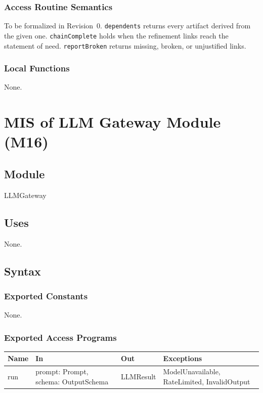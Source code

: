 \documentclass[12pt, titlepage]{article}
\begin{document}
\subsubsection{Access Routine Semantics}

To be formalized in Revision~0. \texttt{dependents} returns every artifact
derived from the given one. \texttt{chainComplete} holds when the refinement
links reach the statement of need. \texttt{reportBroken} returns missing,
broken, or unjustified links.

\subsubsection{Local Functions}

None.

\newpage
\section{MIS of LLM Gateway Module (M16)} \label{MISLLM}

\subsection{Module}

LLMGateway

\subsection{Uses}

None.

\subsection{Syntax}

\subsubsection{Exported Constants}

None.

\subsubsection{Exported Access Programs}

\begin{center}
\small
\begin{tabular}{>{\raggedright\arraybackslash}p{3.7cm} >{\raggedright\arraybackslash}p{3.8cm} >{\raggedright\arraybackslash}p{3.6cm} >{\raggedright\arraybackslash}p{3.7cm}}
\hline
\textbf{Name} & \textbf{In} & \textbf{Out} & \textbf{Exceptions} \\
\hline
run & prompt: Prompt, schema: OutputSchema & LLMResult & ModelUnavailable, RateLimited, InvalidOutput \\
\hline
\end{tabular}
\end{center}
\end{document}
